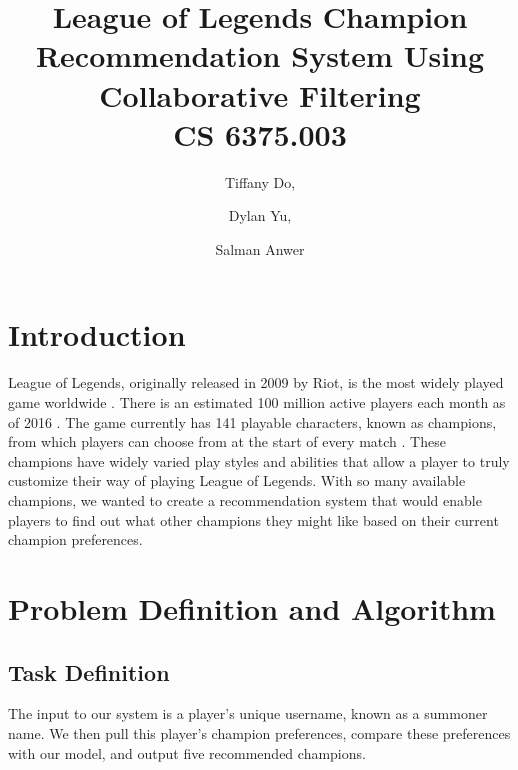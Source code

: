 \documentclass [11pt]{IEEEtran}
\title{League of Legends Champion Recommendation System Using Collaborative Filtering\\ {\large CS 6375.003}}
\author{Tiffany Do, \and Dylan Yu, \and Salman Anwer}
\begin{document}
\maketitle
\section{Introduction}
League of Legends, originally released in 2009 by Riot, is the most widely played game worldwide \cite{gaudiosi_2013}. There is an estimated 100 million active players each month as of 2016 \cite{volk_2016}. The game currently has 141 playable characters, known as champions, from which players can choose from at the start of every match \cite{champlist}. These champions have widely varied play styles and abilities that allow a player to truly customize their way of playing League of Legends. With so many available champions, we wanted to create a recommendation system that would enable players to find out what other champions they might like based on their current champion preferences.

\section{Problem Definition and Algorithm}
\subsection{Task Definition}
The input to our system is a player’s unique username, known as a summoner name. We then pull this player’s champion preferences, compare these preferences with our model, and output five recommended champions.
\end{document}
